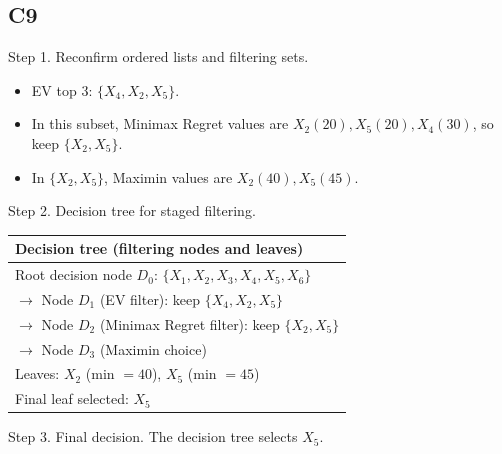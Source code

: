 \begin{ExamProblems}
		\subsection*{C9}
		Step 1. Reconfirm ordered lists and filtering sets.
		\begin{itemize}
			\item EV top 3: $\{X_4,X_2,X_5\}$.
			\item In this subset, Minimax Regret values are $X_2(20),X_5(20),X_4(30)$, so keep $\{X_2,X_5\}$.
			\item In $\{X_2,X_5\}$, Maximin values are $X_2(40),X_5(45)$.
		\end{itemize}

		Step 2. Decision tree for staged filtering.
		\begin{center}
			\begin{tabular}{l}
				\toprule
				Decision tree (filtering nodes and leaves) \\
				\midrule
				Root decision node $D_0$: $\{X_1,X_2,X_3,X_4,X_5,X_6\}$ \\
				$\rightarrow$ Node $D_1$ (EV filter): keep $\{X_4,X_2,X_5\}$ \\
				$\rightarrow$ Node $D_2$ (Minimax Regret filter): keep $\{X_2,X_5\}$ \\
				$\rightarrow$ Node $D_3$ (Maximin choice) \\
				Leaves: $X_2$ (min $=40$), $X_5$ (min $=45$) \\
				Final leaf selected: $X_5$ \\
				\bottomrule
			\end{tabular}
		\end{center}

		Step 3. Final decision.
		The decision tree selects $X_5$.
	\end{ExamProblems}

